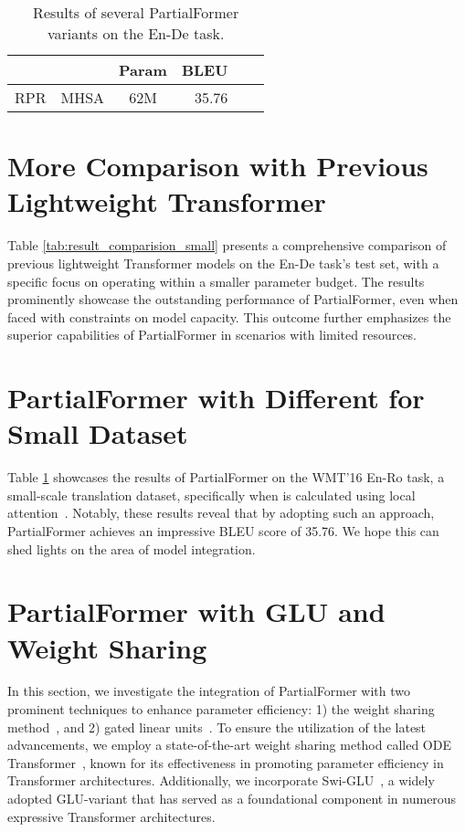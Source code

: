 \documentclass[11pt]{article}
\begin{document}
\begin{table}[ht!]
    \centering
    \renewcommand{\arraystretch}{1}
\centering
\small
\setlength{\tabcolsep}{3pt}

\begin{tabular}{cccrcr}
\toprule
 \bf  & \bf  & \bf Param & \bf BLEU \\

\midrule
RPR  &MHSA &62M & 35.76  \\
\bottomrule
\end{tabular}
\caption{Results of several PartialFormer variants on the En-De task.}
\label{tab:PartialFormer_A_G_VARIANTS}
\end{table}







\section{More Comparison with Previous Lightweight Transformer}


Table \ref{tab:result_comparision_small} presents a comprehensive comparison of previous lightweight Transformer models on the En-De task's test set, with a specific focus on operating within a smaller parameter budget. The results prominently showcase the outstanding performance of PartialFormer, even when faced with constraints on model capacity. This outcome further emphasizes the superior capabilities of PartialFormer in scenarios with limited resources.

\section{PartialFormer with Different  for Small Dataset}
\label{sec:partial_different_A_G}
Table \ref{tab:PartialFormer_A_G_VARIANTS} showcases the results of PartialFormer on the WMT'16 En-Ro task, a small-scale translation dataset, specifically when  is calculated using local attention~\cite{shaw-etal-2018-self}. Notably, these results reveal that by adopting such an approach, PartialFormer achieves an impressive BLEU score of 35.76. We hope this can shed lights on the area of model integration.
\section{PartialFormer with GLU and Weight Sharing}

 

In this section, we investigate the integration of PartialFormer with two prominent techniques to enhance parameter efficiency: 1) the weight sharing method~\cite{Lan2020ALBERT}, and 2) gated linear units~\cite{Dauphin2017GLU}. To ensure the utilization of the latest advancements, we employ a state-of-the-art weight sharing method called ODE Transformer~\cite{li-etal-2022-ode}, known for its effectiveness in promoting parameter efficiency in Transformer architectures. Additionally, we incorporate Swi-GLU~\cite{shazeer2020glu}, a widely adopted GLU-variant that has served as a foundational component in numerous expressive Transformer architectures.
\end{document}
